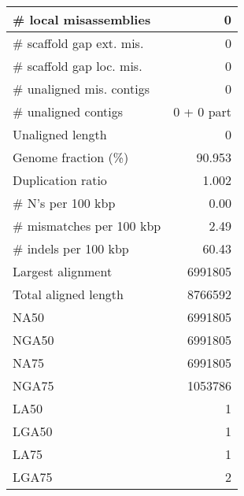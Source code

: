 \documentclass[12pt,a4paper]{article}
\begin{document}
\begin{table}[ht]
\begin{center}
\begin{tabular}{|l*{1}{|r}|}
\# local misassemblies & 0 \\ \hline
\# scaffold gap ext. mis. & 0 \\ \hline
\# scaffold gap loc. mis. & 0 \\ \hline
\# unaligned mis. contigs & 0 \\ \hline
\# unaligned contigs & 0 + 0 part \\ \hline
Unaligned length & 0 \\ \hline
Genome fraction (\%) & 90.953 \\ \hline
Duplication ratio & 1.002 \\ \hline
\# N's per 100 kbp & 0.00 \\ \hline
\# mismatches per 100 kbp & 2.49 \\ \hline
\# indels per 100 kbp & 60.43 \\ \hline
Largest alignment & 6991805 \\ \hline
Total aligned length & 8766592 \\ \hline
NA50 & 6991805 \\ \hline
NGA50 & 6991805 \\ \hline
NA75 & 6991805 \\ \hline
NGA75 & 1053786 \\ \hline
LA50 & 1 \\ \hline
LGA50 & 1 \\ \hline
LA75 & 1 \\ \hline
LGA75 & 2 \\ \hline
\end{tabular}
\end{center}
\end{table}
\end{document}
